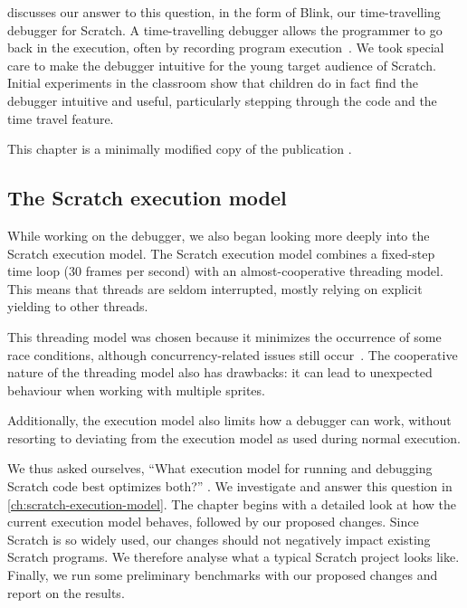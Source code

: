\documentclass[../main]{subfiles}
\begin{document}
 discusses our answer to this question, in the form of Blink, our time-travelling debugger for Scratch.
A time-travelling debugger allows the programmer to go back in the execution, often by recording program execution~\autocite{barrTardisAffordableTimetravel2014,barrTimetravelDebuggingJavaScript2016,czaplickiAsynchronousFunctionalReactive2013,balzerEXDAMSExtendableDebugging1969,ungarDebuggingExperienceImmediacy1997,chenReversibleDebuggingUsing2001,crescenziReversibleExecutionVisualization2000}.
We took special care to make the debugger intuitive for the young target audience of Scratch.
Initial experiments in the classroom show that children do in fact find the debugger intuitive and useful, particularly stepping through the code and the time travel feature.

This chapter is a minimally modified copy of the publication \textcite{strijbolBlinkEducationalSoftware2024}.

\subsection{The Scratch execution model}\label{subsec:the-scratch-execution-model}

While working on the debugger, we also began looking more deeply into the Scratch execution model.
The Scratch execution model combines a fixed-step time loop (30 frames per second) with an almost-cooperative threading model.
This means that threads are seldom interrupted, mostly relying on explicit yielding to other threads.

This threading model was chosen because it minimizes the occurrence of some race conditions, although concurrency-related issues still occur~\autocite{maloneyScratchProgrammingLanguage2010}.
The cooperative nature of the threading model also has drawbacks: it can lead to unexpected behaviour when working with multiple sprites.

Additionally, the execution model also limits how a debugger can work, without resorting to deviating from the execution model as used during normal execution.

We thus asked ourselves, ``What execution model for running and debugging Scratch code best optimizes both?'' .
We investigate and answer this question in \cref{ch:scratch-execution-model}.
The chapter begins with a detailed look at how the current execution model behaves, followed by our proposed changes.
Since Scratch is so widely used, our changes should not negatively impact existing Scratch programs.
We therefore analyse what a typical Scratch project looks like.
Finally, we run some preliminary benchmarks with our proposed changes and report on the results.
\end{document}
